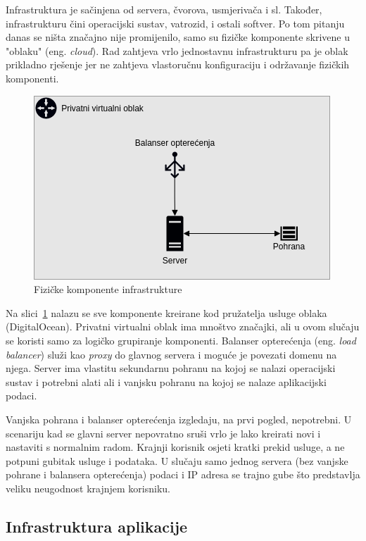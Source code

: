 Infrastruktura je sačinjena od servera, čvorova, usmjerivača i sl.
Također, infrastrukturu čini operacijski sustav, vatrozid, i ostali softver\cite{ibm-infrastructure}.
Po tom pitanju danas se ništa značajno nije promijenilo, samo su fizičke komponente skrivene u "oblaku" (eng. \textit{cloud}).
Rad zahtjeva vrlo jednostavnu infrastrukturu pa je oblak prikladno rješenje jer ne zahtjeva vlastoručnu konfiguraciju i održavanje fizičkih komponenti.

\begin{figure}[h!]
    \centering
    \includegraphics[scale=0.7]{images/infrastructure}
    \caption{Fizičke komponente infrastrukture}
    \label{fig:physical-infrastructure}
\end{figure}

Na slici~\ref{fig:physical-infrastructure} nalazu se sve komponente kreirane kod pružatelja usluge oblaka (DigitalOcean).
Privatni virtualni oblak ima mnoštvo značajki, ali u ovom slučaju se koristi samo za logičko grupiranje komponenti.
Balanser opterećenja (eng. \textit{load balancer}) služi kao \textit{proxy} do glavnog servera i moguće je povezati domenu na njega.
Server ima vlastitu sekundarnu pohranu na kojoj se nalazi operacijski sustav i potrebni alati ali i vanjsku pohranu na kojoj se nalaze aplikacijski podaci.

Vanjska pohrana i balanser opterećenja izgledaju, na prvi pogled, nepotrebni.
U scenariju kad se glavni server nepovratno sruši vrlo je lako kreirati novi i nastaviti s normalnim radom.
Krajnji korisnik osjeti kratki prekid usluge, a ne potpuni gubitak usluge i podataka.
U slučaju samo jednog servera (bez vanjske pohrane i balansera opterećenja) podaci i IP adresa se trajno gube što predstavlja veliku
neugodnost krajnjem korisniku.

\subsection{Infrastruktura aplikacije}

